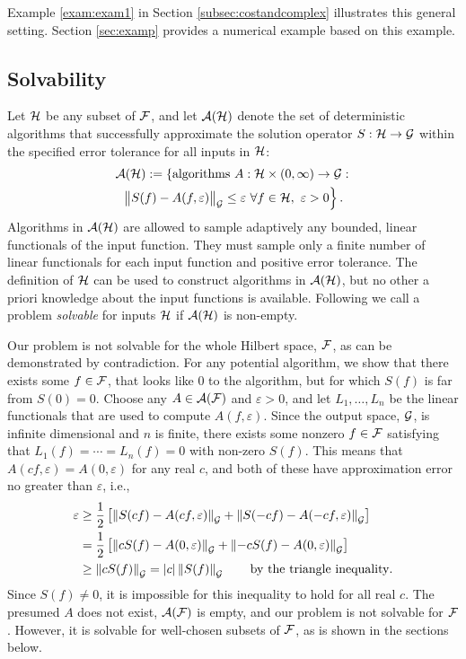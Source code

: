 \documentclass[graybox,footinfo]{svmult}
\newcommand{\DHJRnorm}[2][{}]{\ensuremath{\left \lVert #2 \right \rVert}_{#1}}
\newcommand{\DHJRbignorm}[2][{}]{\ensuremath{\bigl \lVert #2 \bigr \rVert}_{#1}}
\newcommand{\DHJRabs}[1]{\ensuremath{{\left \lvert #1 \right \rvert}}}
\begin{document}
Example \ref{exam:exam1} in Section \ref{subsec:costandcomplex} illustrates this general setting.  Section \ref{sec:examp} provides a numerical example based on this example.

\subsection{Solvability}  Let ${\mathcal{H}}$ be any subset of ${\mathcal{F}}$, and let ${\mathcal{A}}({\mathcal{H}})$ denote the set of deterministic algorithms that successfully approximate the solution operator $S : {\mathcal{H}} \to {\mathcal{G}}$ within the specified error tolerance for all inputs in ${\mathcal{H}}$:
\begin{multline} \label{adapErrCrit}
\calA(\calH) : = \left\{ \text{algorithms } A:\calH \times (0,\infty) \rightarrow \calG : 
\right . \\ \left .
\DHJRbignorm[\calG]{S(f) - A(f,\varepsilon)} \le \varepsilon \ \forall f \in \calH, \ \varepsilon > 0 
\right \}.
\end{multline}
Algorithms in ${\mathcal{A}}({\mathcal{H}})$ are allowed to sample adaptively any bounded, linear functionals
of the input function.  They must sample only a finite number of linear functionals for each input function and positive error tolerance.  The definition of ${\mathcal{H}}$ can be used to construct algorithms in ${\mathcal{A}}({\mathcal{H}})$, but no other a priori knowledge about the input functions is available.  Following \cite{KunEtal19a} we call a problem \emph{solvable} for inputs ${\mathcal{H}}$ if ${\mathcal{A}}({\mathcal{H}})$ is non-empty.

Our problem is not solvable for the whole Hilbert space, ${\mathcal{F}}$, as can be demonstrated by contradiction. For any potential algorithm, we show that there exists some $f \in {\mathcal{F}}$, that looks like $0$ to the algorithm, but for which $S(f)$ is far from $S(0) = 0$.   Choose any $A \in {\mathcal{A}}({\mathcal{F}})$ and $\varepsilon > 0$, and let $L_1, \ldots, L_n$ be the linear functionals that are used to compute $A(f,\varepsilon)$. Since the output space, ${\mathcal{G}}$, is infinite dimensional and $n$ is finite, there exists some nonzero $f \in {\mathcal{F}}$ satisfying that $L_1(f) = \cdots = L_n(f) = 0$ with non-zero $S(f)$. This means that $A(cf,\varepsilon) = A(0,\varepsilon)$ for any real $c$, and both of these have approximation error no greater than $\varepsilon$, i.e.,
\begin{align*}
    \varepsilon &\ge \frac 12 \left[ \DHJRnorm[\calG]{S(cf) - A(cf,\varepsilon)} + \DHJRnorm[\calG]{S(-cf) - A(-cf,\varepsilon)}\right] \\
    & =  \frac 12 \left[ \DHJRnorm[\calG]{cS(f) - A(0,\varepsilon)} + \DHJRnorm[\calG]{-cS(f) - A(0,\varepsilon)}\right] \\
    & \ge  \DHJRnorm[\calG]{cS(f)} = \DHJRabs{c}\DHJRnorm[\calG]{S(f)}  \qquad \text{by the triangle inequality}.
\end{align*}
Since $S(f) \ne 0$, it is impossible for this inequality to hold for all real $c$.  The presumed $A$ does not exist, ${\mathcal{A}}({\mathcal{F}})$ is empty, and our problem is not solvable for ${\mathcal{F}}$. However, it is solvable for well-chosen subsets of ${\mathcal{F}}$, as is shown in the sections below.
\end{document}
